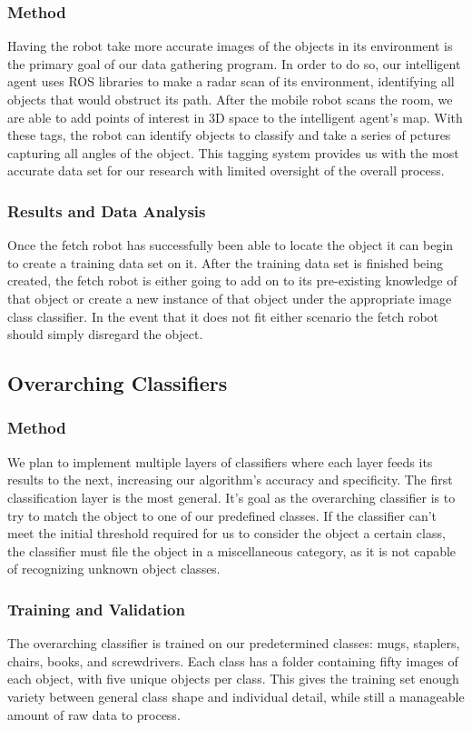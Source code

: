 \documentclass[draftclsnofoot, onecolumn, 10pt, compsoc]{IEEEtran}
\begin{document}
			\subsubsection{Method}
				Having the robot take more accurate images of the objects in its environment is the primary goal of our data gathering program. In order to do so, our intelligent agent uses ROS libraries to make a radar scan of its environment, identifying all objects that would obstruct its path. After the mobile robot scans the room, we are able to add points of interest in 3D space to the intelligent agent's map. With these tags, the robot can identify objects to classify and take a series of pctures capturing all angles of the object. This tagging system provides us with the most accurate data set for our research with limited oversight of the overall process. 
			
			\subsubsection{Results and Data Analysis}
				Once the fetch robot has successfully been able to locate the object it can begin to create a training data set on it. After the training data set is finished being created, the fetch robot is either going to add on to its pre-existing knowledge of that object or create a new instance of that object under the appropriate image class classifier. In the event that it does not fit either scenario the fetch robot should simply disregard the object. 
		
		\subsection{Overarching Classifiers}
			\subsubsection{Method}
				We plan to implement multiple layers of classifiers where each layer feeds its results to the next, increasing our algorithm’s accuracy and specificity. The first classification layer is the most general. It’s goal as the overarching classifier is to try to match the object to one of our predefined classes. If the classifier can’t meet the initial threshold required for us to consider the object a certain class, the classifier must file the object in a miscellaneous category, as it is not capable of recognizing unknown object classes.
			
			\subsubsection{Training and Validation}
				The overarching classifier is trained on our predetermined classes: mugs, staplers, chairs, books, and screwdrivers. Each class has a folder containing fifty images of each object, with five unique objects per class. This gives the training set enough variety between general class shape and individual detail, while still a manageable amount of raw data to process. 
				
\end{document}
